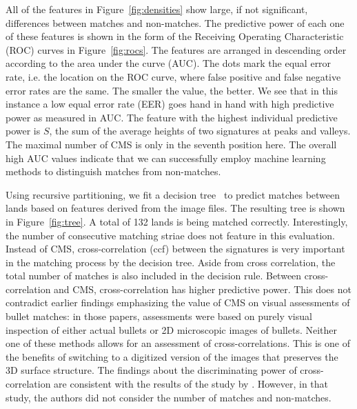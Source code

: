 \documentclass[aoas, preprint]{imsart}\usepackage[]{graphicx}\usepackage[]{color}
\begin{document}
All of the features in Figure~\ref{fig:densities} show large, if not significant, differences between matches and non-matches. The predictive power of each one of these features is shown in the form of the Receiving Operating Characteristic (ROC) curves in Figure~\ref{fig:rocs}. The features are arranged in descending order according to the area under the curve (AUC).
The dots mark the equal error rate, i.e. the location on the ROC curve, where false positive and false negative error rates are the same. The smaller the value, the better. We see that in this instance a low equal error rate (EER) goes hand in hand with high predictive power as measured in AUC.
The feature with the highest individual predictive power is $S$, the sum of the average heights of two signatures at peaks and valleys. The maximal number of CMS is only in the seventh position here. The overall high AUC values indicate that we can successfully employ machine learning methods to distinguish matches from non-matches.

Using recursive partitioning, we fit a decision tree~\citep{breiman:1984, rpart, rpart.plot} to predict matches between lands based on features derived from the image files. The resulting tree is shown in Figure~\ref{fig:tree}. A total of 132 lands is being matched correctly. Interestingly, the number of consecutive matching striae does not feature in this evaluation. 
Instead of CMS, cross-correlation (ccf) between the signatures is very important in the matching process  by the decision tree. Aside from  cross correlation, the total number of matches is also included in the decision rule. 
Between cross-correlation and CMS, cross-correlation has higher  predictive power. This  does not  contradict earlier findings emphasizing the value of CMS on visual assessments of bullet matches: in those papers, assessments were based on purely visual inspection of either actual bullets or 2D microscopic images of bullets.
Neither one of these methods allows for an assessment of cross-correlations. This is one of the benefits of switching to a digitized version of the images that preserves the 3D surface structure. The findings about the discriminating power of cross-correlation are consistent with the results of the study by \citet{ma:2004}. However, in that study, the authors did not consider the number of matches and non-matches.
\end{document}
